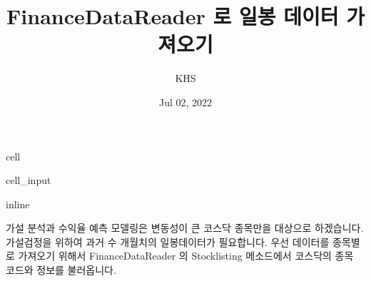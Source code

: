 \documentclass[letterpaper,10pt,english]{jupyterBook}
\title{FinanceDataReader 로 일봉 데이터 가져오기}
\date{Jul 02, 2022}
\author{KHS}
\begin{document}
\pagestyle{empty}
\sphinxmaketitle
\pagestyle{plain}
\sphinxtableofcontents
\pagestyle{normal}
\label{\detokenize{chapter4/4.4.1_Data_Collection::doc}}
\begin{sphinxuseclass}{cell}\begin{sphinxVerbatimInput}

\begin{sphinxuseclass}{cell_input}
\begin{sphinxVerbatim}[commandchars=\\\{\}]
   
   
 inline
 
    
   
   
 
 

  
\end{sphinxVerbatim}

\end{sphinxuseclass}\end{sphinxVerbatimInput}

\end{sphinxuseclass}


\sphinxAtStartPar
가설 분석과 수익율 예측 모델링은 변동성이 큰 코스닥 종목만을 대상으로 하겠습니다.
가설검정을 위하여 과거 수 개월치의 일봉데이터가 필요합니다. 우선 데이터를 종목별로 가져오기 위해서 FinanceDataReader 의 Stocklisting 메소드에서 코스닥의 종목 코드와 정보를 불러옵니다.
\end{document}
